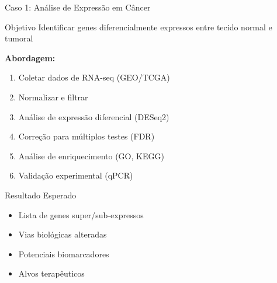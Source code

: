 \begin{frame}[shrink=15]{Caso 1: Análise de Expressão em Câncer}
\begin{block}{Objetivo}
Identificar genes diferencialmente expressos entre tecido normal e tumoral
\end{block}

\textbf{Abordagem:}
\begin{enumerate}
    \item Coletar dados de RNA-seq (GEO/TCGA)
    \item Normalizar e filtrar
    \item Análise de expressão diferencial (DESeq2)
    \item Correção para múltiplos testes (FDR)
    \item Análise de enriquecimento (GO, KEGG)
    \item Validação experimental (qPCR)
\end{enumerate}

\vspace{0.3cm}

\begin{exampleblock}{Resultado Esperado}
\begin{itemize}
    \item Lista de genes super/sub-expressos
    \item Vias biológicas alteradas
    \item Potenciais biomarcadores
    \item Alvos terapêuticos
\end{itemize}
\end{exampleblock}
\end{frame}

